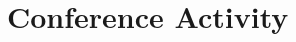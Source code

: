 \documentclass[11pt,letterpaper]{report}
\begin{document}









    \section*{Conference Activity}



\end{document}
